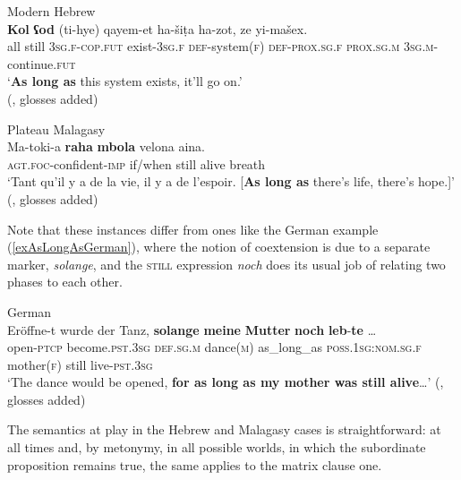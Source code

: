 \begin{exe}
	\ex Modern Hebrew\label{exAsLongAsHebrew}\\
	\gll \textbf{Kol} \textbf{ʕod} (ti-hye) qayem-et ha-šiṭa ha-zot, ze yi-mašex.\\
	all still \phantom{(}3\textsc{sg}.\textsc{f}-\textsc{cop}.\textsc{fut} exist-3\textsc{sg}.\textsc{f} \textsc{def}-system(\textsc{f}) \textsc{def}-\textsc{prox}.\textsc{sg}.\textsc{f} \textsc{prox}.\textsc{sg}.\textsc{m} 3\textsc{sg}.\textsc{m}-continue.\textsc{fut}\\
	\glt \lq \textbf{As long as} this system exists, it'll go on.'
	\\(\cite[548]{Glinert1989}, glosses added)
	
	\ex Plateau Malagasy\label{exAsLongAsMalagasy}\\
	\gll Ma-toki-a \textbf{raha} \textbf{mbola} velona aina.\\
	\textsc{agt}.\textsc{foc}-confident-\textsc{imp} if/when still alive breath\\
	\glt \lq Tant qu'il y a de la vie, il y a de l’espoir. [\textbf{As long as} there's life, there's hope.]' (\cite[157]{MalagasyPhd}, glosses added)	
\end{exe}

Note that these instances differ from ones like the German example (\ref{exAsLongAsGerman}), where the notion of coextension is due to a separate marker, \textit{solange}, and the \textsc{still} expression \textit{noch} does its usual job of relating two phases to each other.

\begin{exe}
	\ex German\label{exAsLongAsGerman}\\
	\gll Eröffne-t wurde der Tanz, \textbf{solange} \textbf{meine} \textbf{Mutter} \textbf{noch} \textbf{leb}-\textbf{te} … \\
	open-\textsc{ptcp} become.\textsc{pst}.3\textsc{sg} \textsc{def}.\textsc{sg}.\textsc{m} dance(\textsc{m}) as\_long\_as \textsc{poss}.1\textsc{sg}:\textsc{nom}.\textsc{sg}.\textsc{f} mother(\textsc{f}) still live-\textsc{pst}.3\textsc{sg}\\
	\glt \lq The dance would be opened, \textbf{for as long as my mother was still alive}…\rq{ }(\cite[621]{MetrichFaucher2009}, glosses added)
\end{exe}

The semantics at play in the Hebrew and Malagasy cases is straightforward: at all times and, by metonymy, in all possible worlds, in which the subordinate proposition remains true, the same applies to the matrix clause one. 

